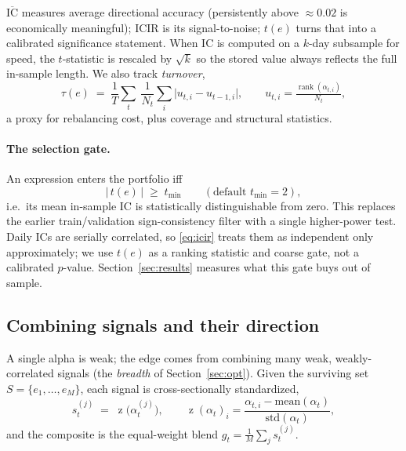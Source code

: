 \documentclass{article}
\theoremstyle{definition}
\theoremstyle{plain}
\theoremstyle{remark}
\newcommand{\IC}{\mathrm{IC}}
\newcommand{\ICIR}{\mathrm{ICIR}}
\newcommand{\rank}{\operatorname{rank}}
\newcommand{\zscore}{\operatorname{z}}
\begin{document}
$\overline{\IC}$ measures average directional accuracy (persistently above
$\approx0.02$ is economically meaningful); $\ICIR$ is its signal-to-noise; $t(e)$ turns
that into a calibrated significance statement. When IC is computed on a $k$-day
subsample for speed, the $t$-statistic is rescaled by $\sqrt{k}$ so the stored value
always reflects the full in-sample length. We also track \emph{turnover},
\begin{equation}
\tau(e) \;=\; \frac{1}{T}\sum_{t} \ \frac{1}{N_t}\sum_i \big| u_{t,i} - u_{t-1,i}\big|,
\qquad u_{t,i} = \tfrac{\rank(\alpha_{t,i})}{N_t},
\label{eq:turnover}
\end{equation}
a proxy for rebalancing cost, plus coverage and structural statistics.

\paragraph{The selection gate.} An expression enters the portfolio iff
\begin{equation}
\big|\,t(e)\,\big| \;\ge\; t_{\min} \qquad (\text{default } t_{\min}=2),
\label{eq:gate}
\end{equation}
i.e.\ its mean in-sample IC is statistically distinguishable from zero. This replaces
the earlier train/validation sign-consistency filter with a single higher-power test.
Daily ICs are serially correlated, so \eqref{eq:icir} treats them as independent only
approximately; we use $t(e)$ as a ranking statistic and coarse gate, not a calibrated
$p$-value. Section~\ref{sec:results} measures what this gate buys out of sample.

\subsection{Combining signals and their direction}
\label{sec:combine}

A single alpha is weak; the edge comes from combining many weak, weakly-correlated
signals (the \emph{breadth} of Section~\ref{sec:opt}). Given the surviving set
$S=\{e_1,\dots,e_M\}$, each signal is cross-sectionally standardized,
\begin{equation}
s^{(j)}_t \;=\; \zscore\!\big(\alpha^{(j)}_t\big),
\qquad
\zscore(\alpha_t)_i = \frac{\alpha_{t,i}-\mathrm{mean}(\alpha_t)}{\mathrm{std}(\alpha_t)},
\label{eq:orient}
\end{equation}
and the composite is the equal-weight blend $g_t = \tfrac1M\sum_j s^{(j)}_t$.
\end{document}
